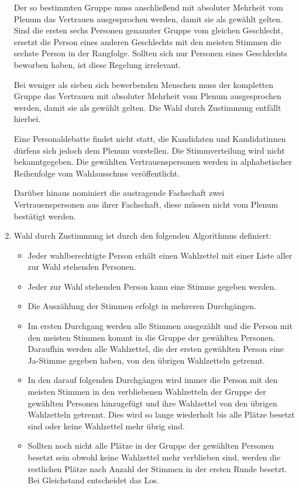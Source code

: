 \documentclass[draft,12pt,oneside]{scrreprt}
\begin{document}
\begin{enumerate}
      Der so bestimmten Gruppe muss anschließend mit absoluter Mehrheit vom
      Plenum das Vertrauen ausgesprochen werden, damit sie als gewählt gelten.
      Sind die ersten sechs Personen genannter Gruppe vom gleichen Geschlecht,
      ersetzt die Person eines anderen Geschlechts mit den meisten Stimmen die
      sechste Person in der Rangfolge.
      Sollten sich nur Personen eines Geschlechts beworben haben, ist diese
      Regelung irrelevant.

      Bei weniger als sieben sich bewerbenden Menschen muss der kompletten Gruppe
      das Vertrauen mit absoluter Mehrheit vom Plenum ausgesprochen werden,
      damit sie als gewählt gelten.
      Die Wahl durch Zustimmung entfällt hierbei.

      Eine Personaldebatte findet nicht statt, die Kandidaten und Kandidatinnen
      dürfens sich jedoch dem Plenum vorstellen.
      Die Stimmverteilung wird nicht bekanntgegeben.
      Die gewählten Vertrauenspersonen werden in alphabetischer Reihenfolge
      vom Wahlausschuss veröffentlicht.

      Darüber hinaus nominiert die austragende Fachschaft zwei Vertrauenspersonen
      aus ihrer Fachschaft, diese müssen nicht vom Plenum bestätigt werden.

\item Wahl durch Zustimmung ist durch den folgenden Algorithmus definiert:
      \begin{itemize}
      \item Jeder wahlberechtigte Person erhält einen Wahlzettel mit einer
            Liste aller zur Wahl stehenden Personen.
      \item Jeder zur Wahl stehenden Person kann eine Stimme gegeben werden.
      \item Die Auszählung der Stimmen erfolgt in mehreren Durchgängen.
      \item Im ersten Durchgang werden alle Stimmen ausgezählt und die Person
            mit den meisten Stimmen kommt in die Gruppe der gewählten Personen.
            Daraufhin werden alle Wahlzettel, die der ersten gewählten Person
            eine Ja-Stimme gegeben haben, von den übrigen Wahlzetteln getrennt.
      \item In den darauf folgenden Durchgängen wird immer die Person mit den
            meisten Stimmen in den verbliebenen Wahlzetteln der Gruppe der gewählten
            Personen hinzugefügt und ihre Wahlzettel von den übrigen Wahlzetteln
            getrennt. Dies wird so lange wiederholt bis alle Plätze besetzt sind
            oder keine Wahlzettel mehr übrig sind.
      \item Sollten noch nicht alle Plätze in der Gruppe der gewählten Personen
            besetzt sein obwohl keine Wahlzettel mehr verblieben sind, werden
            die restlichen Plätze nach Anzahl der Stimmen in der ersten Runde
            besetzt. Bei Gleichstand entscheidet das Los.
      \end{itemize}


\end{enumerate}
\end{document}

